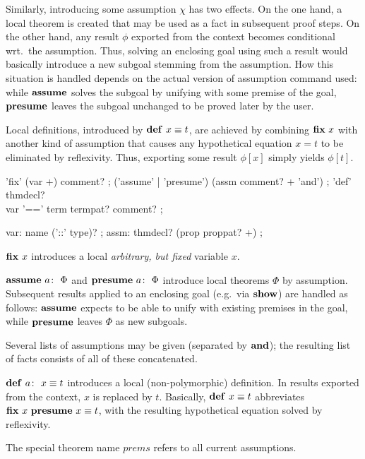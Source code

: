 Similarly, introducing some assumption $\chi$ has two effects.  On the one
hand, a local theorem is created that may be used as a fact in subsequent
proof steps.  On the other hand, any result $\phi$ exported from the context
becomes conditional wrt.\ the assumption.  Thus, solving an enclosing goal
using such a result would basically introduce a new subgoal stemming from the
assumption.  How this situation is handled depends on the actual version of
assumption command used: while ${\mathord{\mathbf{assume}}}$ solves the subgoal by unifying
with some premise of the goal, ${\mathord{\mathbf{presume}}}$ leaves the subgoal unchanged to
be proved later by the user.

Local definitions, introduced by $\DEF{}{x \equiv t}$, are achieved by
combining ${\mathord{\mathbf{fix}}}~x$ with another kind of assumption that causes any
hypothetical equation $x = t$ to be eliminated by reflexivity.  Thus,
exporting some result $\phi[x]$ simply yields $\phi[t]$.

\begin{rail}
  'fix' (var +) comment?
  ;
  ('assume' | 'presume') (assm comment? + 'and')
  ;
  'def' thmdecl? \\ var '==' term termpat? comment?
  ;

  var: name ('::' type)?
  ;
  assm: thmdecl? (prop proppat? +)
  ;
\end{rail}

\begin{descr}
\item [${\mathord{\mathbf{fix}}}~x$] introduces a local \emph{arbitrary, but fixed} variable $x$.
\item [$\ASSUME{a}{\Phi}$ and $\PRESUME{a}{\Phi}$] introduce local theorems
  $\Phi$ by assumption.  Subsequent results applied to an enclosing goal
  (e.g.\ via ${\mathord{\mathbf{show}}}$) are handled as follows: ${\mathord{\mathbf{assume}}}$ expects to be
  able to unify with existing premises in the goal, while ${\mathord{\mathbf{presume}}}$
  leaves $\Phi$ as new subgoals.
  
  Several lists of assumptions may be given (separated by
  ${\mathord{\mathbf{and}}}$); the resulting list of facts consists of all of these
  concatenated.
\item [$\DEF{a}{x \equiv t}$] introduces a local (non-polymorphic) definition.
  In results exported from the context, $x$ is replaced by $t$.  Basically,
  $\DEF{}{x \equiv t}$ abbreviates $\FIX{x}~\PRESUME{}{x \equiv t}$, with the
  resulting hypothetical equation solved by reflexivity.
\end{descr}

The special theorem name $prems$ refers to all current
assumptions.


